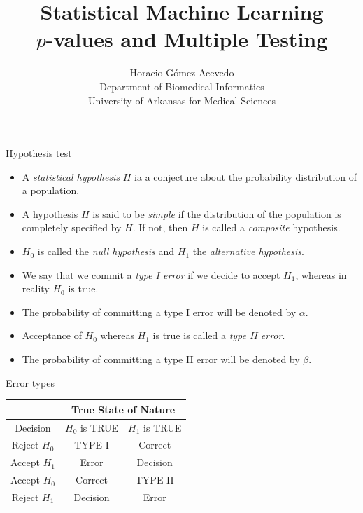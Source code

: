 \documentclass{beamer}
\title{Statistical Machine Learning\\ $p$-values and Multiple Testing}
\author{Horacio G\'omez-Acevedo\\ Department of Biomedical Informatics\\
	University of Arkansas for Medical Sciences}
\begin{document}
	\begin{frame}[plain]
		\maketitle
	\end{frame}
	
	\begin{frame}{Hypothesis test}
		\begin{itemize}
			\item A \textit{statistical hypothesis} $H$ ia a conjecture about the probability distribution of a population.
			\item A hypothesis $H$ is said to be \textit{simple} if the distribution of the population is completely specified by $H$. If not, then $H$ is called a \textit{composite} hypothesis.
			\item $H_0$ is called the \textit{null hypothesis} and $H_1$ the \textit{alternative hypothesis}.
			\item  We say that we commit a  \textit{type I error} if we decide to accept $H_1$, whereas in reality $H_0$ is true.
			\item  The probability of committing a type I error will be denoted by $\alpha$.
			\item Acceptance of $H_0$ whereas $H_1$ is true is called a \textit{type II error}. 
			\item  The probability of committing a type II error will be denoted by $\beta$.  
		\end{itemize}		

	\end{frame}

\begin{frame}{Error types}
	\centering
	\begin{tabular}{|c|c|c|}
		\hline
		&\multicolumn{2}{c|}{True State of Nature}\\
		\hline
		Decision & $H_0$ is TRUE & $H_1$ is TRUE\\
		\hline
		{\color{blue} Reject $H_0$}& TYPE I  & Correct  \\
		{\color{red} Accept $H_1$} & Error & Decision\\
		\hline
		{\color{blue} Accept $H_0$}& Correct  & TYPE II  \\
		{\color{red} Reject $H_1$} & Decision &  Error\\
		\hline
	\end{tabular}
\end{frame}
\end{document}
